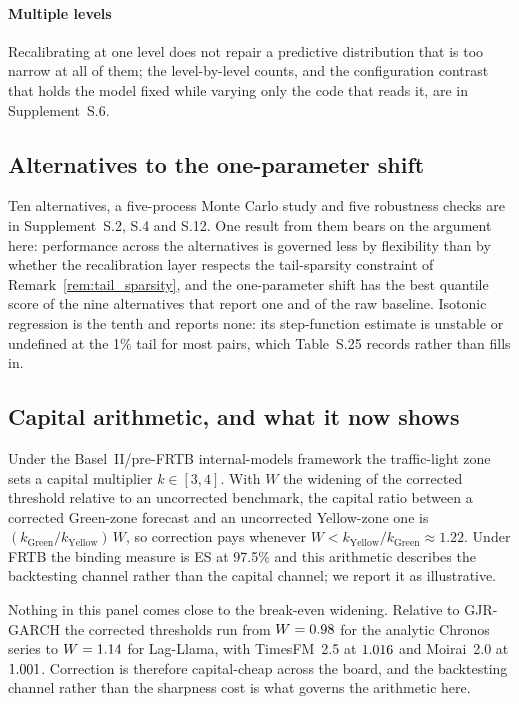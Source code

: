 \documentclass[preprint,11pt,authoryear]{elsarticle}
\newcommand{\1}{\boldsymbol{1}}
\begin{document}
\paragraph{Multiple levels} Recalibrating at one level does not repair a
predictive distribution that is too narrow at all of them; the level-by-level
counts, and the configuration contrast that holds the model fixed while varying
only the code that reads it, are in Supplement~S.6.

\subsection{Alternatives to the one-parameter shift}
\label{sec:baselines}

Ten alternatives, a five-process Monte Carlo study and five robustness checks are
in Supplement~S.2, S.4 and S.12. One result from them bears on the argument here:
performance across the alternatives is governed less by flexibility than by
whether the recalibration layer respects the tail-sparsity constraint of
Remark~\ref{rem:tail_sparsity}, and the one-parameter shift has the best quantile
score of the nine alternatives that report one and of the raw baseline.
Isotonic regression is the tenth and reports none: its step-function estimate is
unstable or undefined at the 1\% tail for most pairs, which Table~S.25
records rather than fills in.
\subsection{Capital arithmetic, and what it now shows}
\label{sec:economic}

Under the Basel~II/pre-FRTB internal-models framework the traffic-light zone sets
a capital multiplier $k \in [3,4]$. With $W$ the widening of the corrected
threshold relative to an uncorrected benchmark, the capital ratio between a
corrected Green-zone forecast and an uncorrected Yellow-zone one is
$(k_{\mathrm{Green}}/k_{\mathrm{Yellow}})\,W$, so correction pays whenever
$W < k_{\mathrm{Yellow}}/k_{\mathrm{Green}} \approx 1.22$. Under FRTB the binding
measure is ES at 97.5\% and this arithmetic describes the backtesting channel
rather than the capital channel; we report it as illustrative.

Nothing in this panel comes close to the break-even widening. Relative to
GJR-GARCH the corrected thresholds run from $W = 0.98$ for the analytic Chronos series to $W = 1.14$ for Lag-Llama, with TimesFM~2.5 at $1.016$ and
Moirai~2.0 at $1.001$. Correction is therefore capital-cheap
across the board, and the backtesting channel rather than the sharpness cost is
what governs the arithmetic here.
\end{document}
